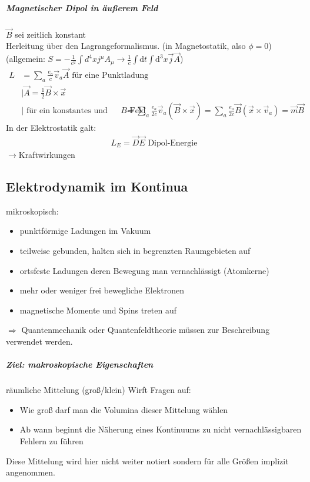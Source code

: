 \documentclass[a4paper]{article}
\begin{document}
\subparagraph{Magnetischer Dipol in äußerem Feld}
$\vec{B}$ sei zeitlich konstant\\
Herleitung über den Lagrangeformalismus. (in Magnetostatik, also $\phi=0$)\\
(allgemein: $ S=-\frac{1}{c^2}\int d^4x j^\mu A_\mu\rightarrow \frac{1}{c}\int
\mathrm{d}t \int \mathrm{d}^3x \vec{j}\vec{A}$)
\begin{align}
L&=\sum_a\frac{e_a}{c}\vec{v}_a\vec{A} \text{ für eine Punktladung}\\
&|\vec{A}=\frac{1}{2}\vec{B}\times\vec{x} \\&|\text{ für ein konstantes und
 Ortsunabhängiges }B\text{-Feld}
&=\sum_a\frac{e_a}{2c}\vec{v}_a(\vec{B}\times\vec{x})=\sum_a\frac{e_a}{2c}
\vec{B}(\vec{x}\times\vec{v}_a)=\vec{m}\vec{B}
\end{align}
In der Elektrostatik galt:
\begin{align}
L_E=\vec{D}\vec{E} \text{  Dipol-Energie}
\end{align}
$\rightarrow$Kraftwirkungen


\subsection{Elektrodynamik im Kontinua}
mikroskopisch: 
\begin{itemize}
  \item punktförmige Ladungen im Vakuum
  \item teilweise gebunden, halten sich in  begrenzten Raumgebieten auf
  \item ortsfeste Ladungen deren Bewegung man vernachlässigt (Atomkerne)
  \item mehr oder weniger frei bewegliche Elektronen
  \item magnetische Momente und Spins treten auf
\end{itemize}
$\Rightarrow$ Quantenmechanik oder Quantenfeldtheorie müssen zur Beschreibung
verwendet werden.
\subparagraph{Ziel: makroskopische Eigenschaften}
räumliche Mittelung (groß/klein)
Wirft Fragen auf:
\begin{itemize}
  \item Wie groß darf man die Volumina dieser Mittelung wählen
  \item Ab wann beginnt die Näherung eines Kontinuums zu nicht
  vernachlässigbaren Fehlern zu führen
\end{itemize}
Diese Mittelung wird hier nicht weiter notiert sondern für alle Größen implizit
angenommen.
\end{document}
